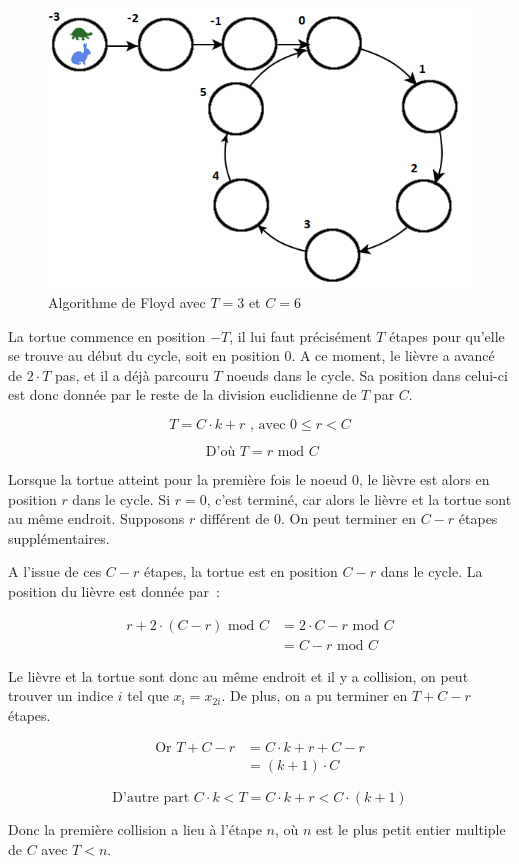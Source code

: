 	\begin{figure}
	\center
	\includegraphics[scale=0.5]{Floyd.png}
	\caption{Algorithme de Floyd avec $T=3$ et $C=6$}
	\end{figure}
				
	La tortue commence en position $-T$, il lui faut précisément $T$ étapes pour qu'elle se trouve au début du cycle, soit en position $0$. A ce moment, le lièvre a avancé de $2 \cdot T$ pas, et il a déjà parcouru $T$ noeuds dans le cycle. Sa position dans celui-ci est donc donnée par le reste de la division euclidienne de $T$ par $C$.	
				
	$$ T = C \cdot k + r \text{ , avec } 0 \leq r < C $$
				
	$$\text{ D'où } T = r \text{ mod } C $$
				
	Lorsque la tortue atteint pour la première fois le noeud $0$, le lièvre est alors en position $r$ dans le cycle. Si $r=0$, c'est terminé, car alors le lièvre et la tortue sont au même endroit. Supposons $r$ différent de $0$. On peut terminer en $C-r$ étapes supplémentaires.
				
	A l'issue de ces $C-r$ étapes, la tortue est en position $C-r$ dans le cycle. La position du lièvre est donnée par~:
				
	\begin{align*}
          r + 2 \cdot (C - r) \text{ mod } C &= 2 \cdot C -r \text{ mod } C \\
                                             &= C - r \text{ mod } C
        \end{align*}
				
	Le lièvre et la tortue sont donc au même endroit et il y a collision, on peut trouver un indice $i$ tel que $x_i = x_{2i}$. De plus, on a pu terminer en $T + C - r$ étapes.
				
	\begin{align*}
          \text{Or } T + C - r &= C \cdot k + r + C - r \\
                               &=(k + 1) \cdot C
        \end{align*}
				
	$$ \text{D'autre part } C \cdot k < T = C \cdot k + r < C \cdot (k + 1) $$
				
	Donc la première collision a lieu à l'étape $n$, où $n$ est le plus petit entier multiple de $C$ avec $T < n$.
